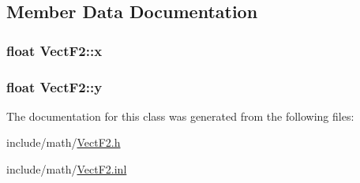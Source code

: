 \subsection{Member Data Documentation}
\hypertarget{classVectF2_aa1751cb36f85aa579157bd8d511f5955}{
\subsubsection[{x}]{\setlength{\rightskip}{0pt plus 5cm}float Vect\-F2\-::x}}\label{classVectF2_aa1751cb36f85aa579157bd8d511f5955}
\hypertarget{classVectF2_a2d7333f3cbb480c0b7ba99a7cc96a72f}{
\subsubsection[{y}]{\setlength{\rightskip}{0pt plus 5cm}float Vect\-F2\-::y}}\label{classVectF2_a2d7333f3cbb480c0b7ba99a7cc96a72f}


The documentation for this class was generated from the following files\-:\begin{DoxyCompactItemize}
\item 
include/math/\hyperlink{VectF2_8h}{Vect\-F2.\-h}\item 
include/math/\hyperlink{VectF2_8inl}{Vect\-F2.\-inl}\end{DoxyCompactItemize}
